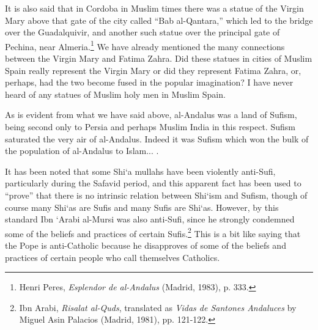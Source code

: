 It is also said that in Cordoba in Muslim times there was a statue of the Virgin Mary above that gate of the city called ``Bab al-Qantara,'' which led to the bridge over the Guadalquivir, and another such statue over the principal gate of Pechina, near Almeria.\footnote{Henri Peres, \emph{Esplendor de al-Andalus} (Madrid, 1983), p. 333.} We have already mentioned the many connections between the Virgin Mary and Fatima Zahra. Did these statues in cities of Muslim Spain really represent the Virgin Mary or did they represent Fatima Zahra, or, perhaps, had the two become fused in the popular imagination? I have never heard of any statues of Muslim holy men in Muslim Spain.

As is evident from what we have said above, al-Andalus was a land of Sufism, being second only to Persia and perhaps Muslim India in this respect. Sufism saturated the very air of al-Andalus. Indeed it was Sufism which won the bulk of the population of al-Andalus to Islam... .

It has been noted that some Shi`a mullahs have been violently anti-Sufi, particularly during the Safavid period, and this apparent fact has been used to ``prove'' that there is no intrinsic relation between Shi`ism and Sufism, though of course many Shi`as are Sufis and many Sufis are Shi`as. However, by this standard Ibn `Arabi al-Mursi was also anti-Sufi, since he strongly condemned some of the beliefs and practices of certain Sufis.\footnote{Ibn Arabi, \emph{Risalat al-Quds}, translated as \emph{Vidas de Santones Andaluces} by Miguel Asin Palacios (Madrid, 1981), pp. 121-122.} This is a bit like saying that the Pope is anti-Catholic because he disapproves of some of the beliefs and practices of certain people who call themselves Catholics.

